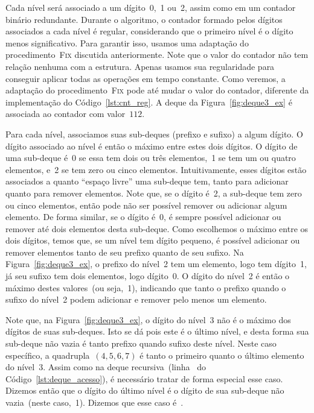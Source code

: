\documentclass[main.tex]{subfiles}
\begin{document}
Cada nível será associado a um dígito~0,~1 ou~2, assim como em um contador binário redundante. Durante o algoritmo, o contador formado pelos dígitos associados a cada nível é regular, considerando que o primeiro nível é o dígito menos significativo. Para garantir isso, usamos uma adaptação do procedimento~\textsc{Fix} discutida anteriormente. Note que o valor do contador não tem relação nenhuma com a estrutura. Apenas usamos sua regularidade para conseguir aplicar todas as operações em tempo constante. Como veremos, a adaptação do procedimento~\textsc{Fix} pode até mudar o valor do contador, diferente da implementação do Código~\ref{lst:cnt_reg}. A deque da Figura~\ref{fig:deque3_ex} é associada ao contador com valor~$112$.

Para cada nível, associamos suas sub-deques (prefixo e sufixo) a algum dígito. O dígito associado ao nível é então o máximo entre estes dois dígitos. O dígito de uma sub-deque é~0 se essa tem dois ou três elementos,~1 se tem um ou quatro elementos, e~2 se tem zero ou cinco elementos. Intuitivamente, esses dígitos estão associados a quanto ``espaço livre'' uma sub-deque tem, tanto para adicionar quanto para remover elementos. Note que, se o dígito é~2, a sub-deque tem zero ou cinco elementos, então pode não ser possível remover ou adicionar algum elemento. De forma similar, se o dígito é~0, é sempre possível adicionar ou remover até dois elementos desta sub-deque. Como escolhemos o máximo entre os dois dígitos, temos que, se um nível tem dígito pequeno, é possível adicionar ou remover elementos tanto de seu prefixo quanto de seu sufixo. Na Figura~\ref{fig:deque3_ex}, o prefixo do nível~2 tem um elemento, logo tem dígito~1, já seu sufixo tem dois elementos, logo dígito~0. O dígito do nível~2 é então o máximo destes valores~(ou seja,~1), indicando que tanto o prefixo quando o sufixo do nível~2 podem adicionar e remover pelo menos um elemento.

Note que, na Figura~\ref{fig:deque3_ex}, o dígito do nível~3 não é o máximo dos dígitos de suas sub-deques. Isto se dá pois este é o último nível, e desta forma sua sub-deque não vazia é tanto prefixo quando sufixo deste nível. Neste caso específico, a quadrupla~$(4, 5, 6, 7)$ é tanto o primeiro quanto o último elemento do nível~3. Assim como na deque recursiva~(linha~ do Código~\ref{lst:deque_acesso}), é necessário tratar de forma especial esse caso. Dizemos então que o dígito do último nível é o dígito de sua sub-deque não vazia~(neste caso,~1). Dizemos que esse caso é~.
\end{document}
